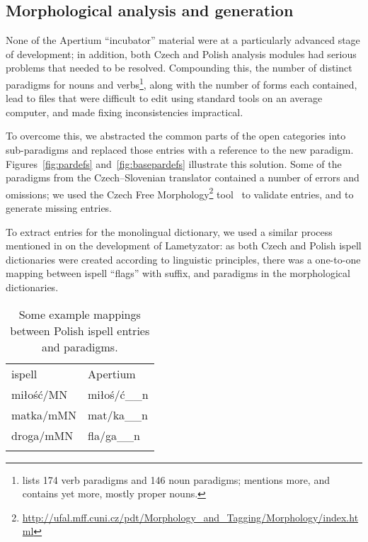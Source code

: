 \documentclass[11pt]{article}
\begin{document}
\subsection{Morphological analysis and generation}

None of the Apertium ``incubator'' material were at a particularly advanced stage of development; in addition, both 
Czech and Polish analysis modules had serious problems that needed to be resolved. Compounding this, the 
number of distinct paradigms for nouns and verbs\footnote{\citet{Jagodzinski08} lists 174 verb 
paradigms and 146 noun paradigms; \citet{Bielec98} mentions more, and \citet{Futrega09}
contains yet more, mostly proper nouns.}, along with the number of forms each 
contained, lead to files that were difficult to edit using standard tools on an average 
computer, and made fixing inconsistencies impractical.

To overcome this, we abstracted the common parts of the open categories into sub-paradigms 
and replaced those entries with a reference to the new paradigm. Figures~\ref{fig:pardefs}
and~\ref{fig:basepardefs} illustrate this solution. Some of the paradigms from the Czech--Slovenian
translator contained a number of errors and omissions; we used the Czech Free 
Morphology\footnote{\url{http://ufal.mff.cuni.cz/pdt/Morphology_and_Tagging/Morphology/index.html}}
tool~\citep{Hacic2004} to validate entries, and to generate missing entries.

To extract entries for the monolingual dictionary, we used a similar process mentioned in \cite{Weiss05}
on the development of Lametyzator:
as both Czech and Polish ispell dictionaries were created according to linguistic principles, there 
was a one-to-one mapping between ispell ``flags'' with suffix, and paradigms in the 
morphological dictionaries.


\begin{table}
\begin{center}
 \caption{Some example mappings between Polish ispell entries and paradigms.}
 \begin{tabular}{ll}
    \hline\noalign{\smallskip}
    ispell      & Apertium\\
    \noalign{\smallskip}\hline\noalign{\smallskip}
    miłość$/$MN & miłoś$/$ć\_\_n\\
    matka$/$mMN & mat$/$ka\_\_n\\
    droga$/$mMN & fla$/$ga\_\_n\\
    \hline\noalign{\smallskip}
 \end{tabular}
\end{center}
\end{table}
\end{document}
